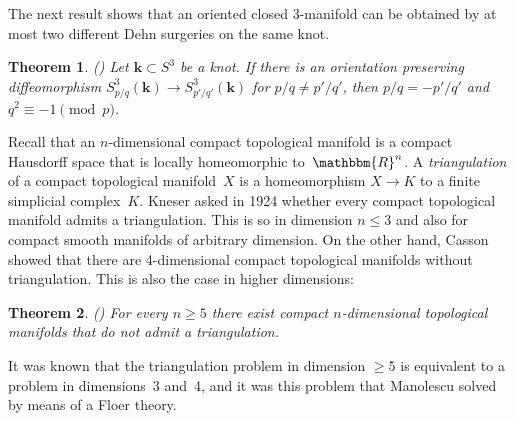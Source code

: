 \documentclass[12pt,twoside]{amsart}
\theoremstyle{plain}
\newtheorem{theorem}{Theorem}[section]
\numberwithin{figure}{section}
\numberwithin{equation}{section}
\def\m{\medskip}
\def\kk{\boldsymbol{k}}
\def\RR{\mathbbm{R}}
\def\m{\medskip}
\begin{document}
The next result shows that an oriented closed 3-manifold can be obtained by at most two different Dehn surgeries on the same knot. 

\begin{theorem}
{\rm (\cite{Wu11, NiWu15})}
Let $\kk \subset S^3$ be a knot. 
If there is an orientation preserving diffeomorphism 
$S^3_{p/q} (\kk) \to S^3_{p'/q'} (\kk)$
for $p/q \neq p'/q'$, then $p/q = -p'/q'$ and $q^2 \equiv -1 \pmod p$.
\end{theorem}

\m
Recall that an $n$-dimensional compact topological manifold is a compact Hausdorff space  
that is locally homeomorphic to~$\RR^n$.
A {\it triangulation}\/ of a compact topological manifold~$X$ is a homeomorphism $X \to K$
to a finite simplicial complex~$K$.
Kneser asked in 1924 whether every compact topological manifold admits a triangulation.
This is so in dimension $n \leqslant 3$ and also for compact smooth manifolds of arbitrary dimension.
On the other hand, Casson showed that there are 4-dimensional compact topological manifolds 
without triangulation.
This is also the case in higher dimensions:

\begin{theorem}
{\rm (\cite{Ma15})}
For every $n \geqslant 5$ there exist compact $n$-dimensional topological manifolds
that do not admit a triangulation. 
\end{theorem}

It was known that the triangulation problem in dimension $\geqslant 5$ is equivalent
to a problem in dimensions~3 and~4, and it was this problem that Manolescu
solved by means of a Floer theory.
\end{document}
